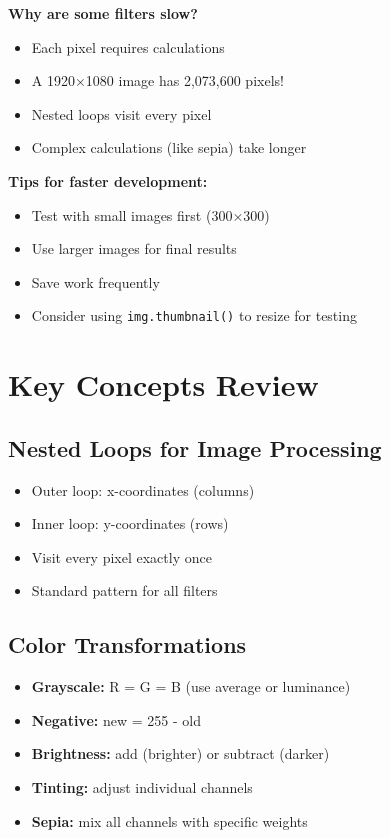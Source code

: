 \documentclass[11pt]{article}
\begin{document}
\textbf{Why are some filters slow?}

\begin{itemize}
    \item Each pixel requires calculations
    \item A 1920×1080 image has 2,073,600 pixels!
    \item Nested loops visit every pixel
    \item Complex calculations (like sepia) take longer
\end{itemize}

\textbf{Tips for faster development:}
\begin{itemize}
    \item Test with small images first (300×300)
    \item Use larger images for final results
    \item Save work frequently
    \item Consider using \texttt{img.thumbnail()} to resize for testing
\end{itemize}

\section*{Key Concepts Review}

\subsection*{Nested Loops for Image Processing}
\begin{itemize}
    \item Outer loop: x-coordinates (columns)
    \item Inner loop: y-coordinates (rows)
    \item Visit every pixel exactly once
    \item Standard pattern for all filters
\end{itemize}

\subsection*{Color Transformations}
\begin{itemize}
    \item \textbf{Grayscale:} R = G = B (use average or luminance)
    \item \textbf{Negative:} new = 255 - old
    \item \textbf{Brightness:} add (brighter) or subtract (darker)
    \item \textbf{Tinting:} adjust individual channels
    \item \textbf{Sepia:} mix all channels with specific weights
\end{itemize}
\end{document}
